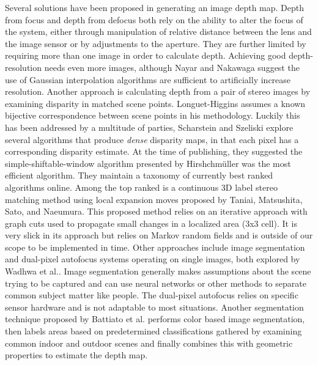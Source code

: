 \documentclass[12pt]{article}
\begin{document}
Several solutions have been proposed in generating an image depth map. Depth from focus\autocite{Nayar1994} and depth from defocus\autocite{Favaro2003} both rely on the ability to alter the focus of the system, either through manipulation of relative distance between the lens and the image sensor or by adjustments to the aperture. They are further limited by requiring more than one image in order to calculate depth. Achieving good depth-resolution needs even more images, although Nayar and Nakawaga\autocite{Nayar1994} suggest the use of Gaussian interpolation algorithms are sufficient to artificially increase resolution. Another approach is calculating depth from a pair of stereo images by examining disparity in matched scene points\autocite{Longuet-Higgins1981}. Longuet-Higgins assumes a known bijective correspondence between scene points in his methodology. Luckily this has been addressed by a multitude of parties, Scharstein and Szeliski\autocite{Scharstein2002} explore several algorithms that produce \textit{dense} disparity maps, in that each pixel has a corresponding disparity estimate. At the time of publishing, they suggested the simple-shiftable-window algorithm presented by Hirshchmüller\autocite{Hirschmuller2002} was the most efficient algorithm. They maintain a taxonomy of currently best ranked algorithms online. Among the top ranked is a continuous 3D label stereo matching method using local expansion moves proposed by Taniai, Matsushita, Sato, and Naeumura\autocite{Taniai2016}. This proposed method relies on an iterative approach with graph cuts used to propagate small changes in a localized area (3x3 cell). It is very slick in its approach but relies on Markov random fields and is outside of our scope to be implemented in time. Other approaches include image segmentation and dual-pixel autofocus systems operating on single images, both explored by Wadhwa et al.\autocite{Wadhwa2018}. Image segmentation generally makes assumptions about the scene trying to be captured and can use neural networks or other methods to separate common subject matter like people. The dual-pixel autofocus relies on specific sensor hardware and is not adaptable to most situations. Another segmentation technique proposed by Battiato et al.\autocite{Battiato2004} performs color based image segmentation, then labels areas based on predetermined classifications gathered by examining common indoor and outdoor scenes and finally combines this with geometric properties to estimate the depth map.
\end{document}
